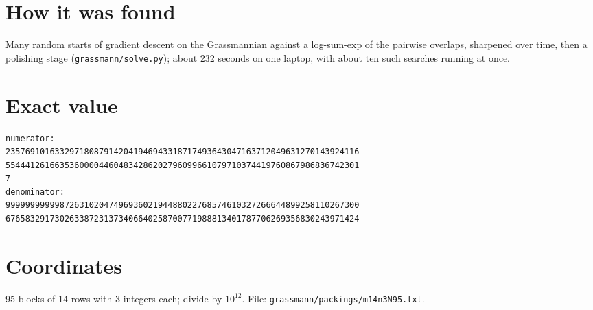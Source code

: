 \documentclass[11pt,a4paper]{article}
\begin{document}
\section{How it was found}
Many random starts of gradient descent on the Grassmannian against a log-sum-exp of the pairwise overlaps, sharpened over time, then a polishing stage (\texttt{grassmann/solve.py}); about 232 seconds on one laptop, with about ten such searches running at once.


\appendix
\section{Exact value}
{\small
\begin{verbatim}
numerator:
235769101633297180879142041946943318717493643047163712049631270143924116
554441261663536000044604834286202796099661079710374419760867986836742301
7
denominator:
999999999998726310204749693602194488022768574610327266644899258110267300
676583291730263387231373406640258700771988813401787706269356830243971424
\end{verbatim}}

\section{Coordinates}
95 blocks of 14 rows with 3 integers each; divide by $10^{12}$. File: \texttt{grassmann/packings/m14n3N95.txt}.
{\tiny
\begin{multicols}{3}
\end{multicols}}
\end{document}
